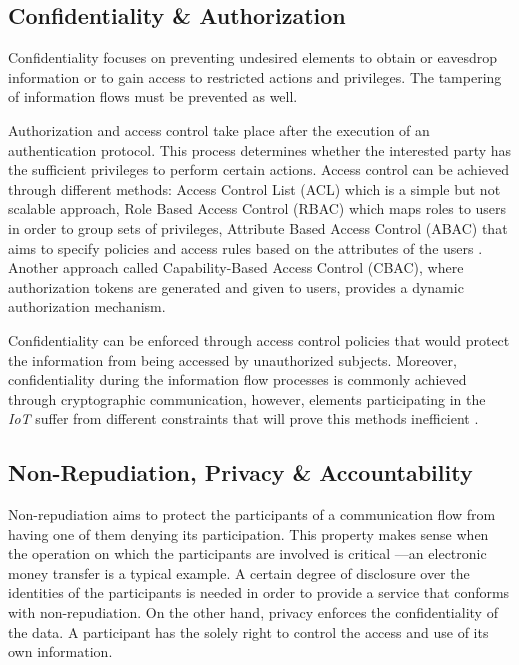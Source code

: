 \documentclass[journal]{IEEEtran}
\begin{document}
  \subsection{Confidentiality \& Authorization}
  Confidentiality focuses on preventing undesired elements to obtain or eavesdrop information or to gain access to restricted actions and privileges. The tampering of information flows must be prevented as well.

  Authorization and access control take place after the execution of an authentication protocol. This process determines whether the interested party has the sufficient privileges to perform certain actions. Access control can be achieved through different methods: Access Control List (ACL) which is a simple but not scalable approach, Role Based Access Control (RBAC) which maps roles to users in order to group sets of privileges, Attribute Based Access Control (ABAC) that aims to specify policies and access rules based on the attributes of the users  \cite{Anggorojati2014}. Another approach called Capability-Based Access Control (CBAC), where authorization tokens are generated and given to users, provides a dynamic authorization mechanism.

  Confidentiality can be enforced through access control policies that would protect the information from being accessed by unauthorized subjects. Moreover, confidentiality during the information flow processes is commonly achieved through cryptographic communication, however, elements participating in the \emph{IoT} suffer from different constraints that will prove this methods inefficient \cite{Baldini2012}.    

  \subsection{Non-Repudiation, Privacy \& Accountability}
  Non-repudiation aims to protect the participants of a communication flow from having one of them denying its participation. This property makes sense when the operation on which the participants are involved is critical ---an electronic money transfer is a typical example. A certain degree of disclosure over the identities of the participants is needed in order to provide a service that conforms with non-repudiation. On the other hand, privacy enforces the confidentiality of the data. A participant has the solely right to control the access and use of its own information.
\end{document}
